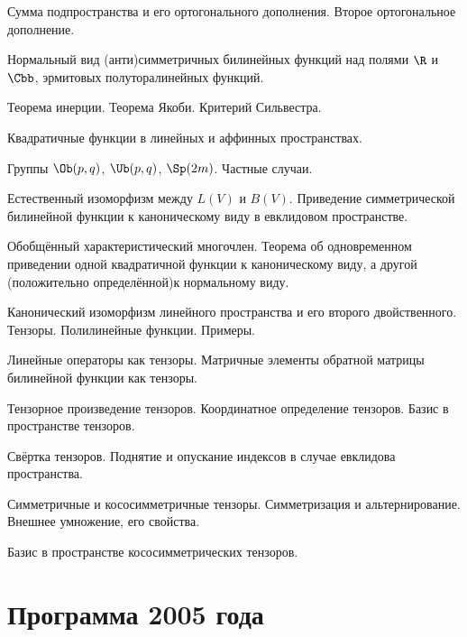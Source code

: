 \documentclass[a4paper]{article}
\begin{document}
\begin{nums}{-2}
Сумма подпространства и его ортогонального дополнения. Второе ортогональное дополнение.
\item Нормальный вид (анти)симметричных билинейных функций над полями $\R$ и $\Cbb$, эрмитовых полуторалинейных функций.
\item Теорема инерции. Теорема Якоби. Критерий Сильвестра.
\item Квадратичные функции в линейных и аффинных пространствах.
\item Группы $\Ob(p,q)$, $\Ub(p,q)$, $\Sp(2m)$. Частные случаи.
\item Естественный изоморфизм между $L(V)$ и $B(V)$. Приведение симметрической билинейной функции к каноническому
виду в евклидовом пространстве.
\item Обобщённый характеристический многочлен. Теорема об одновременном приведении одной квадратичной функции к каноническому
виду, а другой (положительно определённой)\т к нормальному виду.
\item Канонический изоморфизм линейного пространства и его второго двойственного. Тензоры. Полилинейные функции. Примеры.
\item Линейные операторы как тензоры. Матричные элементы обратной матрицы билинейной функции как тензоры.
\item Тензорное произведение тензоров. Координатное определение тензоров. Базис в пространстве тензоров.
\item Свёртка тензоров. Поднятие и опускание индексов в случае евклидова пространства.
\item Симметричные и кососимметричные тензоры. Симметризация и альтернирование. Внешнее умножение, его свойства.
\item Базис в пространстве кососимметрических тензоров.
\end{nums}

\medskip
\dmvntrail

\pagebreak


\section*{Программа 2005 года}
\end{document}

